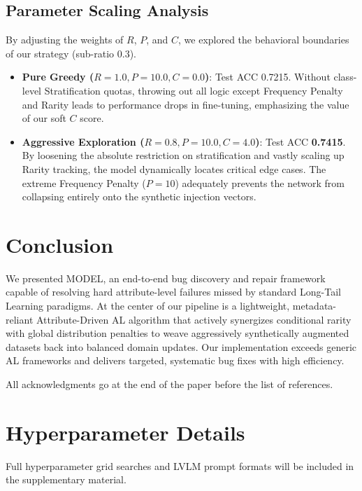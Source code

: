 \documentclass{article}
\newcommand{\model}{MODEL\xspace}
\begin{document}
\subsection{Parameter Scaling Analysis}

By adjusting the weights of $R$, $P$, and $C$, we explored the behavioral boundaries of our strategy (sub-ratio $0.3$). 

\begin{itemize}
    \item \textbf{Pure Greedy ($R=1.0, P=10.0, C=0.0$)}: Test ACC 0.7215. Without class-level Stratification quotas, throwing out all logic except Frequency Penalty and Rarity leads to performance drops in fine-tuning, emphasizing the value of our soft $C$ score.
    \item \textbf{Aggressive Exploration ($R=0.8, P=10.0, C=4.0$)}: Test ACC \textbf{0.7415}. By loosening the absolute restriction on stratification and vastly scaling up Rarity tracking, the model dynamically locates critical edge cases. The extreme Frequency Penalty ($P=10$) adequately prevents the network from collapsing entirely onto the synthetic injection vectors.
\end{itemize}

\section{Conclusion}

We presented \model, an end-to-end bug discovery and repair framework capable of resolving hard attribute-level failures missed by standard Long-Tail Learning paradigms. At the center of our pipeline is a lightweight, metadata-reliant Attribute-Driven AL algorithm that actively synergizes conditional rarity with global distribution penalties to weave aggressively synthetically augmented datasets back into balanced domain updates. Our implementation exceeds generic AL frameworks and delivers targeted, systematic bug fixes with high efficiency.

\begin{ack}
All acknowledgments go at the end of the paper before the list of references.
\end{ack}




\appendix

\section{Hyperparameter Details}
Full hyperparameter grid searches and LVLM prompt formats will be included in the supplementary material.
\end{document}
